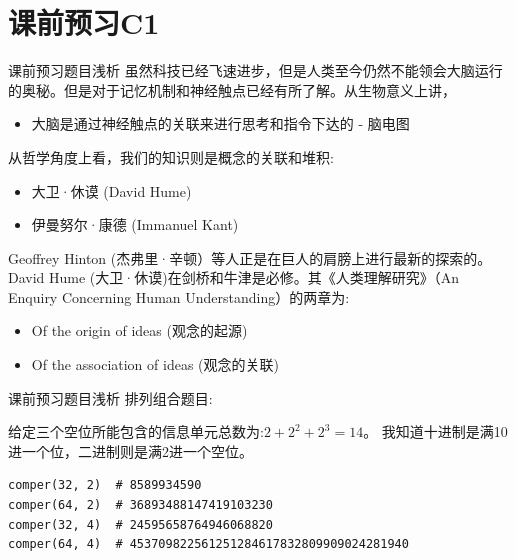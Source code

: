 \documentclass[handout]{beamer}
\begin{document}
\section{课前预习C1}

\begin{frame}{课前预习题目浅析}
	虽然科技已经飞速进步，但是人类至今仍然不能领会大脑运行的奥秘。但是对于记忆机制和神经触点已经有所了解。从生物意义上讲，
	\begin{itemize}
		\item 大脑是通过神经触点的关联来进行思考和指令下达的 - 脑电图
	\end{itemize}
	
	\hfil 
	
	从哲学角度上看，我们的知识则是概念的关联和堆积:
	\begin{itemize}
		\item 大卫·休谟 (David Hume)
		\item 伊曼努尔·康德 (Immanuel Kant) 
	\end{itemize}
	
	\hfil 
	
	Geoffrey Hinton (杰弗里·辛顿）等人正是在巨人的肩膀上进行最新的探索的。David Hume (大卫·休谟)在剑桥和牛津是必修。其《人类理解研究》（An Enquiry Concerning Human Understanding）的两章为:
	\begin{itemize}
		\item Of the origin of ideas (观念的起源)
		\item Of the association of ideas (观念的关联)
	\end{itemize}
\end{frame}

\begin{frame}[fragile]{课前预习题目浅析}
排列组合题目: 
\begin{figure}[H]
		\centering
	\end{figure}	
	给定三个空位所能包含的信息单元总数为:$2+2^2+2^3 = 14$。 我知道十进制是满10进一个位，二进制则是满2进一个空位。
	\begin{lstlisting}
comper(32, 2)  # 8589934590
comper(64, 2)  # 36893488147419103230
comper(32, 4)  # 24595658764946068820
comper(64, 4)  # 453709822561251284617832809909024281940
\end{lstlisting}
\end{frame}
\end{document}
